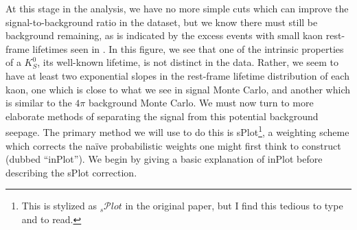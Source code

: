 At this stage in the analysis, we have no more simple cuts which can improve the signal-to-background ratio in the dataset, but we know there must still be background remaining, as is indicated by the excess events with small kaon rest-frame lifetimes seen in . In this figure, we see that one of the intrinsic properties of a $K_S^0$, its well-known lifetime, is not distinct in the data. Rather, we seem to have at least two exponential slopes in the rest-frame lifetime distribution of each kaon, one which is close to what we see in signal Monte Carlo, and another which is similar to the $4\pi$ background Monte Carlo. We must now turn to more elaborate methods of separating the signal from this potential background seepage. The primary method we will use to do this is sPlot\cite{pivk_splot_2005}\footnote{This is stylized as ${}_s\mathcal{P}lot$ in the original paper, but I find this tedious to type and to read.}, a weighting scheme which corrects the na\"ive probabilistic weights one might first think to construct (dubbed ``inPlot''). We begin by giving a basic explanation of inPlot before describing the sPlot correction.


